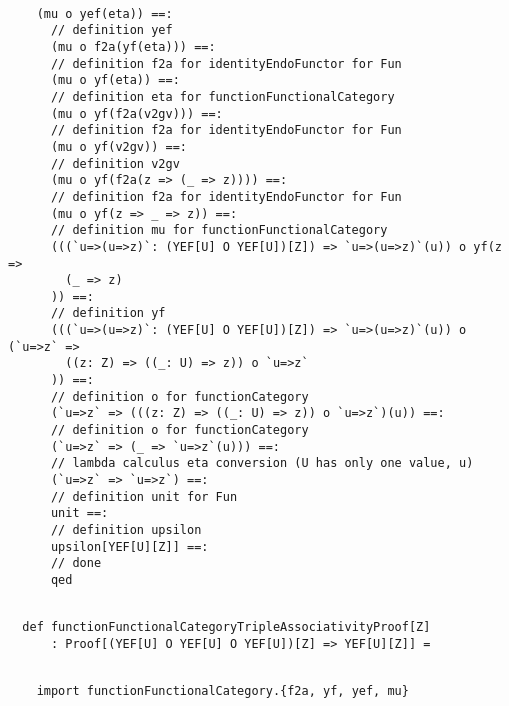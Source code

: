 \documentclass[11pt]{article}
\begin{document}
\begin{mdframed}[backgroundcolor=lightgray!20] 
\begin{lstlisting} 
    
    (mu o yef(eta)) ==:
      // definition yef
      (mu o f2a(yf(eta))) ==:
      // definition f2a for identityEndoFunctor for Fun
      (mu o yf(eta)) ==:
      // definition eta for functionFunctionalCategory
      (mu o yf(f2a(v2gv))) ==:
      // definition f2a for identityEndoFunctor for Fun
      (mu o yf(v2gv)) ==:
      // definition v2gv
      (mu o yf(f2a(z => (_ => z)))) ==:
      // definition f2a for identityEndoFunctor for Fun
      (mu o yf(z => _ => z)) ==:
      // definition mu for functionFunctionalCategory
      (((`u=>(u=>z)`: (YEF[U] O YEF[U])[Z]) => `u=>(u=>z)`(u)) o yf(z =>
        (_ => z)
      )) ==:
      // definition yf
      (((`u=>(u=>z)`: (YEF[U] O YEF[U])[Z]) => `u=>(u=>z)`(u)) o (`u=>z` =>
        ((z: Z) => ((_: U) => z)) o `u=>z`
      )) ==:
      // definition o for functionCategory
      (`u=>z` => (((z: Z) => ((_: U) => z)) o `u=>z`)(u)) ==:
      // definition o for functionCategory
      (`u=>z` => (_ => `u=>z`(u))) ==:
      // lambda calculus eta conversion (U has only one value, u)
      (`u=>z` => `u=>z`) ==:
      // definition unit for Fun
      unit ==:
      // definition upsilon
      upsilon[YEF[U][Z]] ==:
      // done
      qed
\end{lstlisting}
\end{mdframed}
\vspace{6pt}
\begin{mdframed}[backgroundcolor=lightgray!20] 
\begin{lstlisting} 
  
  def functionFunctionalCategoryTripleAssociativityProof[Z]
      : Proof[(YEF[U] O YEF[U] O YEF[U])[Z] => YEF[U][Z]] =
\end{lstlisting}
\end{mdframed}
\vspace{6pt}
\begin{mdframed}[backgroundcolor=lightgray!20] 
\begin{lstlisting}

    import functionFunctionalCategory.{f2a, yf, yef, mu}
\end{lstlisting}
\end{mdframed}
\vspace{6pt}
\clearpage
\end{document}

